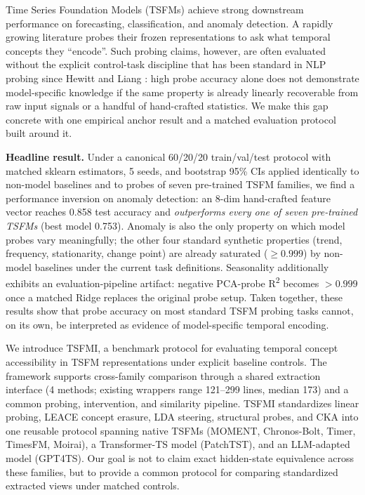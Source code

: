 \documentclass{article}
\begin{document}
Time Series Foundation Models (TSFMs) achieve strong downstream performance on forecasting, classification, and anomaly detection. A rapidly growing literature probes their frozen representations to ask what temporal concepts they ``encode''. Such probing claims, however, are often evaluated without the explicit control-task discipline that has been standard in NLP probing since Hewitt and Liang \cite{HewittLiang2019}: high probe accuracy alone does not demonstrate model-specific knowledge if the same property is already linearly recoverable from raw input signals or a handful of hand-crafted statistics. We make this gap concrete with one empirical anchor result and a matched evaluation protocol built around it.

\textbf{Headline result.} Under a canonical 60/20/20 train/val/test protocol with matched sklearn estimators, 5 seeds, and bootstrap 95\% CIs applied identically to non-model baselines and to probes of seven pre-trained TSFM families, we find a performance inversion on anomaly detection: an 8-dim hand-crafted feature vector reaches 0.858 test accuracy and \emph{outperforms every one of seven pre-trained TSFMs} (best model 0.753). Anomaly is also the only property on which model probes vary meaningfully; the other four standard synthetic properties (trend, frequency, stationarity, change point) are already saturated ($\geq 0.999$) by non-model baselines under the current task definitions. Seasonality additionally exhibits an evaluation-pipeline artifact: negative PCA-probe R\textsuperscript{2} becomes $> 0.999$ once a matched Ridge replaces the original probe setup. Taken together, these results show that probe accuracy on most standard TSFM probing tasks cannot, on its own, be interpreted as evidence of model-specific temporal encoding.

We introduce TSFMI, a benchmark protocol for evaluating temporal concept accessibility in TSFM representations under explicit baseline controls. The framework supports cross-family comparison through a shared extraction interface (4 methods; existing wrappers range 121--299 lines, median 173) and a common probing, intervention, and similarity pipeline. TSFMI standardizes linear probing, LEACE concept erasure, LDA steering, structural probes, and CKA into one reusable protocol spanning native TSFMs (MOMENT, Chronos-Bolt, Timer, TimesFM, Moirai), a Transformer-TS model (PatchTST), and an LLM-adapted model (GPT4TS). Our goal is not to claim exact hidden-state equivalence across these families, but to provide a common protocol for comparing standardized extracted views under matched controls.
\end{document}
